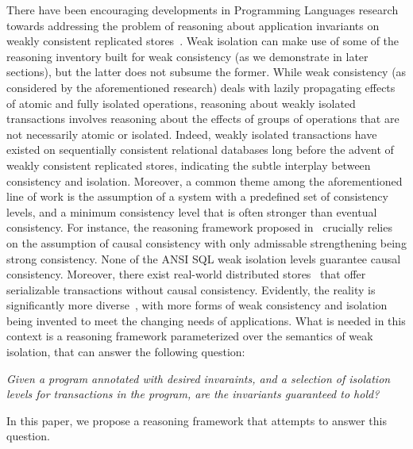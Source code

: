 There have been encouraging developments in Programming Languages
research towards addressing the problem of reasoning about application
invariants on weakly consistent replicated stores~\cite{burckhardt14,
redblueosdi, redblueatc, ecinec, gotsmanpopl16}. Weak isolation can
make use of some of the reasoning inventory built for weak consistency
(as we demonstrate in later sections), but the latter does not subsume
the former. While weak consistency (as considered by the
aforementioned research) deals with lazily propagating effects of
atomic and fully isolated operations, reasoning about weakly isolated
transactions involves reasoning about the effects of groups of
operations that are not necessarily atomic or isolated. Indeed, weakly
isolated transactions have existed on sequentially consistent
relational databases long before the advent of weakly consistent
replicated stores, indicating the subtle interplay between consistency
and isolation. Moreover, a common theme among the aforementioned line
of work is the assumption of a system with a predefined set of
consistency levels, and a minimum consistency level that is often
stronger than eventual consistency. For instance, the reasoning
framework proposed in~\cite{gotsmanpopl16} crucially relies on the
assumption of causal consistency with only admissable strengthening
being strong consistency. None of the ANSI SQL weak isolation levels
guarantee causal consistency. Moreover, there exist real-world
distributed stores~\cite{spanner} that offer serializable transactions
without causal consistency. Evidently, the reality is significantly
more diverse~\cite{zoo}, with more forms of weak consistency and
isolation being invented to meet the changing needs of applications.
What is needed in this context is a reasoning framework parameterized
over the semantics of weak isolation, that can answer the following
question:
\begin{center}
\emph{Given a program annotated with desired invaraints, and a
selection of isolation levels for transactions in the program, are the
invariants guaranteed to hold?}
\end{center}

In this paper, we propose a reasoning framework that attempts to
answer this question.

